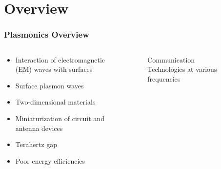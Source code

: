 \documentclass[mathserif,18pt,xcolor=table]{beamer}
\begin{document}
\section{Overview}
\begin{frame}
  \frametitle{Plasmonics Overview}
  \begin{columns} %
    \begin{column}{.5\textwidth}
      \begin{itemize}
        \item Interaction of electromagnetic (EM) waves with surfaces
        \item Surface plasmon waves
        \item Two-dimensional materials
        \item Miniaturization of circuit and antenna devices
        \item Terahertz gap
        \item Poor energy efficiencies
      \end{itemize}
    \end{column}
    \begin{column}{.5\textwidth}
      \begin{figure}
        \hspace*{-1cm}
        \def\svgwidth{1.2\linewidth}
        
        \caption{Communication Technologies at various frequencies}
      \end{figure}
      \end{column}%
    \end{columns}
  \end{frame}
\end{document}
